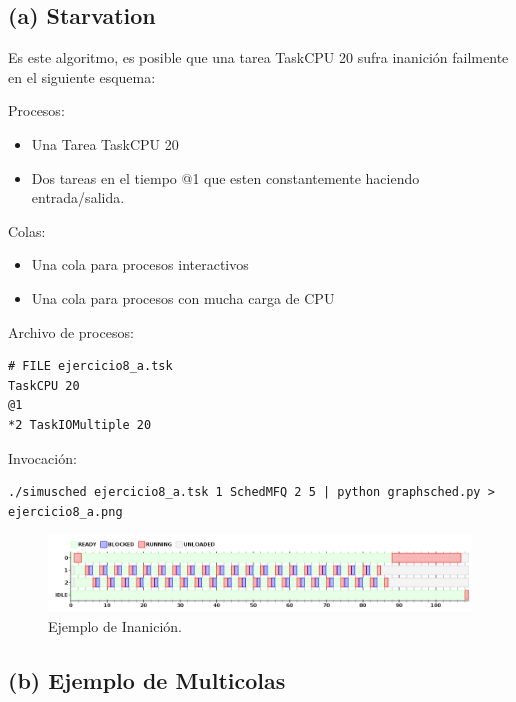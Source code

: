 \subsection{(a) Starvation}

Es este algoritmo, es posible que una tarea TaskCPU 20 sufra inanici\'on failmente en el siguiente esquema:

Procesos:
\begin{itemize}
 \item Una Tarea TaskCPU 20
 \item Dos tareas en el tiempo @1 que esten constantemente haciendo entrada/salida.
\end{itemize}

Colas:
\begin{itemize}
 \item Una cola para procesos interactivos
 \item Una cola para procesos con mucha carga de CPU
\end{itemize}

Archivo de procesos:

\begin{framed}
\begin{verbatim}
# FILE ejercicio8_a.tsk
TaskCPU 20
@1
*2 TaskIOMultiple 20
\end{verbatim}
\end{framed}

Invocaci\'on:

\begin{framed}
\begin{verbatim}
./simusched ejercicio8_a.tsk 1 SchedMFQ 2 5 | python graphsched.py > ejercicio8_a.png
\end{verbatim}
\end{framed}

\begin{figure}[h!]
  \caption{Ejemplo de Inanici\'on.}
  \centering
    \includegraphics[width=1\textwidth]{img/ejercicio8_a.png}
\end{figure}

\subsection{(b) Ejemplo de Multicolas}

